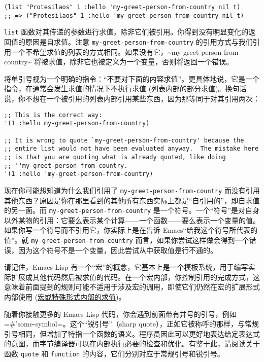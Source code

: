 \documentclass[11pt]{ctexart}
\begin{document}
\begin{verbatim}
(list "Protesilaos" 1 :hello 'my-greet-person-from-country nil t)
;; => ("Protesilaos" 1 :hello 'my-greet-person-from-country nil t)
\end{verbatim}

\texttt{list} 函数对其传递的参数进行求值，除非它们被引用。你得到没有明显变化的返回值的原因是自求值。注意 \texttt{my-greet-person-from-country} 的引用方式与我们引用一个不希望求值的列表的方式相同。如果没有它，\textasciitilde{}my-greet-person-from-country\textasciitilde{} 将被求值，除非它也被定义为一个变量，否则将返回一个错误。

将单引号视为一个明确的指令：“不要对下面的内容求值”。更具体地说，它是一个指令，在通常会发生求值的情况下不执行求值 (\hyperref[sec:org7fa9c71]{列表内部的部分求值})。换句话说，你不想在一个被引用的列表内部引用某些东西，因为那等同于对其引用两次：

\begin{verbatim}
;; This is the correct way:
'(1 :hello my-greet-person-from-country)

;; It is wrong to quote `my-greet-person-from-country' because the
;; entire list would not have been evaluated anyway.  The mistake here
;; is that you are quoting what is already quoted, like doing
;; ''my-greet-person-from-country.
'(1 :hello 'my-greet-person-from-country)
\end{verbatim}

现在你可能想知道为什么我们引用了 \texttt{my-greet-person-from-country} 而没有引用其他东西？原因是你在那里看到的其他所有东西实际上都是“自引用的”，即自求值的另一面。而 \texttt{my-greet-person-from-country} 是一个符号。一个“符号”是对自身以外某物的引用：它要么表示某个计算——一个函数——要么表示一个变量的值。如果你写一个符号而不引用它，你实际上是在告诉 Emacs“给我这个符号所代表的值”。就 \texttt{my-greet-person-from-country} 而言，如果你尝试这样做会得到一个错误，因为这个符号不是一个变量，因此尝试从中获取值是行不通的。

请记住，Emacs Lisp 有一个“宏”的概念，它基本上是一个模板系统，用于编写实际扩展成其他代码然后被求值的代码。在一个宏内部，你控制引用的完成方式，这意味着前面提到的规则可能不适用于涉及宏的调用，即使它们仍然在宏的扩展形式内部使用 (\hyperref[sec:org6bfc8f0]{宏或特殊形式内部的求值})。

随着你接触更多的 Emacs Lisp 代码，你会遇到前面带有井号的引号，例如 =\#'some-symbol=。这个“锐引号”（sharp quote），正如它被称呼的那样，与常规引号相同，但增加了特指一个函数的语义。程序员因此可以更好地表达给定表达式的意图，而字节编译器可以在内部执行必要的检查和优化。有鉴于此，请阅读关于函数 \texttt{quote} 和 \texttt{function} 的内容，它们分别对应于常规引号和锐引号。
\end{document}
